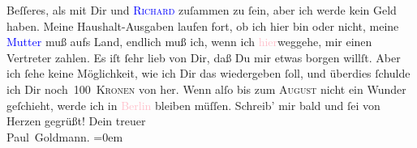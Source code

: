                Beſſeres, als mit Dir und \textsc{\textcolor{blue}{Richard}{}\ledrightnote{\textcolor{blue}{Richard Beer-Hofmann}}} zuſammen zu ſein, aber ich werde kein Geld haben. Meine Haushalt-Ausgaben
               laufen fort, ob ich hier bin oder nicht, meine \textcolor{blue}{Mutter}{}\ledrightnote{{$\rightarrow$}\textcolor{blue}{Clementine Goldmann}} muß aufs Land, endlich muß ich, wenn ich \textcolor{pink}{hier}{}\ledrightnote{{$\rightarrow$}\textcolor{pink}{Berlin}}{ }{\pb}weggehe, mir einen Vertreter zahlen. Es iſt ſehr
               lieb von Dir, daß Du mir etwas borgen willſt. Aber ich ſehe keine Möglichkeit, wie
               ich Dir das wiedergeben ſoll, und überdies ſchulde ich Dir noch 100 \textsc{Kronen} von \label{K_L02917-5v}\label{K_L02917-5h} her. Wenn alſo bis zum \textsc{Auguſt} nicht ein Wunder geſchieht, werde ich in \textcolor{pink}{Berlin}{}\ledrightnote{\textcolor{pink}{Berlin}} bleiben müſſen.\pend
           \pstart
           Schreib’ mir bald und ſei von Herzen gegrüßt!\pend
           \pstart
           Dein treuer {\\[\baselineskip]}\spacefill\mbox{Paul Goldmann.}\pend
           \leftskip=0em{}\endnumbering{}  
      